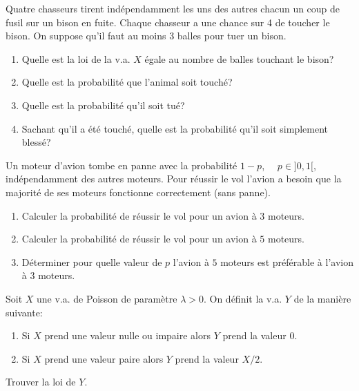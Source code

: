 \documentclass[a4paper,12pt,reqno]{amsart}
\begin{document}
\begin{exo}

  Quatre chasseurs tirent indépendamment les uns des autres  chacun un coup de fusil  sur un bison en fuite. Chaque chasseur a une chance sur 4 de toucher le bison. On suppose qu'il faut au moins 3 balles pour tuer un bison.

  \begin{enumerate}
    \item Quelle est la loi de la v.a. $X$ égale au nombre de balles touchant le bison?
    \item Quelle est la probabilité que l'animal soit touché?
    \item Quelle est la probabilité qu'il soit tué?
    \item Sachant qu'il a été touché, quelle est la probabilité qu'il soit simplement blessé?
  \end{enumerate}

\end{exo}

\begin{exo}

  Un moteur d'avion tombe en panne avec la probabilité $1-p$,~~ $p \in ]0,1[$, indépendamment des autres moteurs. Pour réussir le vol l'avion a besoin que la majorité de ses moteurs fonctionne correctement (sans panne).

  \begin{enumerate}
    \item Calculer la probabilité de réussir le vol pour un avion à $3$ moteurs.
    \item Calculer la probabilité de réussir le vol pour un avion à $5$ moteurs.
    \item Déterminer pour quelle valeur de $p$ l'avion à $5$ moteurs est préférable à l'avion à $3$ moteurs.
  \end{enumerate}

\end{exo}

\begin{exo}

  Soit $X$ une v.a. de Poisson de paramètre $\lambda>0$. On définit la v.a. $Y$ de la manière suivante:
  \begin{enumerate}
    \item Si $X$ prend une valeur nulle ou impaire alors $Y$ prend la valeur $0$.
    \item Si $X$ prend une valeur paire alors $Y$ prend la valeur $X/2$.
  \end{enumerate}
  Trouver la loi de $Y$.

\end{exo}
\end{document}
